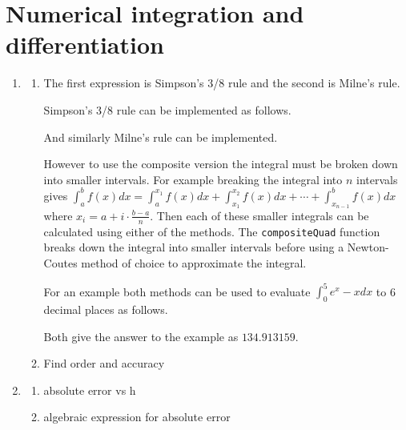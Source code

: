 \documentclass[a4paper,11pt]{article}
\begin{document}
\section{Numerical integration and differentiation}
\begin{enumerate}
	\item \begin{enumerate}
		\item The first expression is Simpson's 3/8 rule and the second is 
		Milne's rule.
		
		Simpson's 3/8 rule can be implemented as follows.
		
		And similarly Milne's rule can be implemented.
		
		However to use the composite version the integral must be broken down 
		into smaller intervals. For example breaking the integral into $n$ 
		intervals gives $\int_{a}^{b}f(x)dx = \int_{a}^{x_{1}}f(x)dx + 
		\int_{x_{1}}^{x_{2}}f(x)dx + \cdots + \int_{x_{n-1}}^{b}f(x)dx$ 
		where 
		$x_{i} = a + i \cdot \frac{b - a}{n}$. Then each of these smaller 
		integrals can be calculated using either of the methods. The 
		\verb*|compositeQuad| function breaks down the integral into smaller 
		intervals before using a Newton-Coutes method of choice to 
		approximate the integral.
		
		For an example both methods can be used to evaluate $\int_{0}^{5} 
		e^{x} - x dx$ to 6 decimal places as follows.
		
		Both give the answer to the example as $134.913159$.
		
		
		\item Find order and accuracy
	\end{enumerate}

	
	\item \begin{enumerate}
		\item absolute error vs h
		
		
		\item algebraic expression for absolute error
	\end{enumerate}
\end{enumerate}
\end{document}
